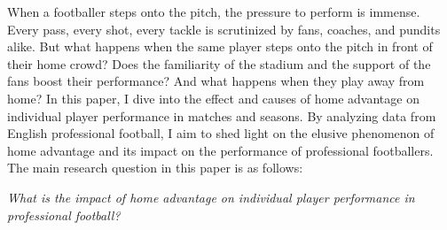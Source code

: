 

When a footballer steps onto the pitch, the pressure to perform is immense. Every pass, every shot, every tackle is scrutinized by fans, coaches, and pundits alike. But what happens when the same player steps onto the pitch in front of their home crowd? Does the familiarity of the stadium and the support of the fans boost their performance? And what happens when they play away from home? In this paper, I dive into the effect and causes of home advantage on individual player performance in matches and seasons. By analyzing data from English professional football, I aim to shed light on the elusive phenomenon of home advantage and its impact on the performance of professional footballers. The main research question in this paper is as follows:
\begin{center}
    \textit{What is the impact of home advantage on individual player performance in professional football?}
\end{center}

